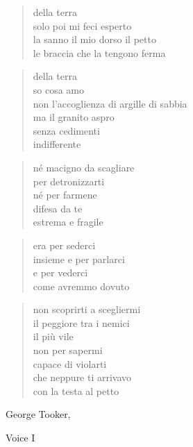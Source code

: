 	\begin{verse}
		della terra\\
		solo poi mi feci esperto\\
		la sanno il mio dorso il petto\\
		le braccia che la tengono ferma
	\end{verse}

	\begin{verse}
		della terra\\
		so cosa amo\\
		non l'accoglienza di argille di sabbia\\
		ma il granito aspro\\
		senza cedimenti\\
		indifferente
	\end{verse}

\clearpage


	\begin{verse}
		né macigno da scagliare\\
		per detronizzarti\\
		né per farmene\\
		difesa da te\\
		estrema e fragile
	\end{verse}

	\begin{verse}
		era per sederci\\
		insieme e per parlarci\\
		e per vederci\\
		come avremmo dovuto
	\end{verse}

	\begin{verse}
		non scoprirti a scegliermi\\
		il peggiore tra i nemici\\
		il più vile\\
		non per sapermi\\
		capace di violarti\\
		che neppure ti arrivavo\\
		con la testa al petto
	\end{verse}

\clearpage


\begin{artItem}
	George Tooker, \begin{otherlanguage}{english}%
		Voice I%
	\end{otherlanguage}
\end{artItem}

